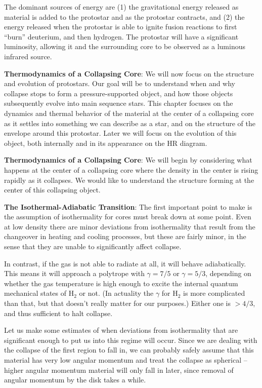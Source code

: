 \documentclass[a4paper,10pt]{article}
\begin{document}
{\noindent}The dominant sources of energy are (1) the gravitational energy released as material is added to the protostar and as the protostar contracts, and (2) the energy released when the protostar is able to ignite fusion reactions to first ``burn'' deuterium, and then hydrogen. The protostar will have a significant luminosity, allowing it and the surrounding core to be observed as a luminous infrared source.

{\noindent}\textbf{Thermodynamics of a Collapsing Core}: We will now focus on the structure and evolution of protostars. Our goal will be to understand when and why collapse stops to form a pressure-supported object, and how those objects subsequently evolve into main sequence stars. This chapter focuses on
the dynamics and thermal behavior of the material at the center of a collapsing core as it settles into something we can describe as a star, and on the structure of the envelope around this protostar. Later we will focus on the evolution of this object, both internally and in its appearance on the HR diagram.

{\noindent}\textbf{Thermodynamics of a Collapsing Core}: We will begin by considering what happens at the center of a collapsing core where the density in the center is rising rapidly as it collapses. We would like to understand the structure forming at the center of this collapsing object.

{\noindent}\textbf{The Isothermal-Adiabatic Transition}: The first important point to make is the assumption of isothermality for cores must break down at some point. Even at low density there are minor deviations from isothermality that result from the changeover in heating and cooling processes, but these are fairly minor, in the sense that they are unable to significantly affect collapse. 

{\noindent}In contrast, if the gas is not able to radiate at all, it will behave adiabatically. This means it will approach a polytrope with $\gamma=7/5$ or $\gamma=5/3$, depending on whether the gas temperature is high enough to excite the internal quantum mechanical states of H$_2$ or not. (In actuality the $\gamma$ for H$_2$ is more complicated than that, but that doesn't really matter for our purposes.) Either one is $>4/3$, and thus sufficient to halt collapse.

{\noindent}Let us make some estimates of when deviations from isothermality that are significant enough to put us into this regime will occur. Since we are dealing with the collapse of the first region to fall in, we can probably safely assume that this material has very low angular momentum and treat the collapse as spherical -- higher angular momentum material will only fall in later, since removal of angular momentum by the disk takes a while.
\end{document}
